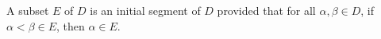 A subset $E$ of $D$ is an initial segment of $D$ provided that for all $\alpha, \beta \in D$, if $\alpha < \beta \in E$, then $\alpha \in E$.